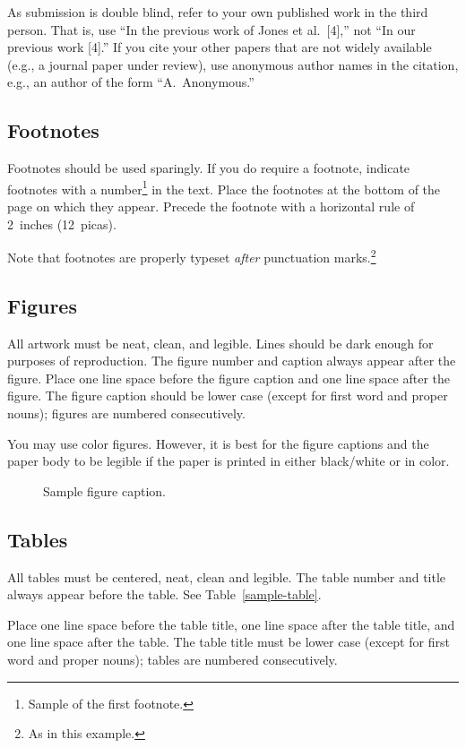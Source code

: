 \documentclass{article}
\begin{document}
As submission is double blind, refer to your own published work in the
third person. That is, use ``In the previous work of Jones et
al.\ [4],'' not ``In our previous work [4].'' If you cite your other
papers that are not widely available (e.g., a journal paper under
review), use anonymous author names in the citation, e.g., an author
of the form ``A.\ Anonymous.''

\subsection{Footnotes}

Footnotes should be used sparingly.  If you do require a footnote,
indicate footnotes with a number\footnote{Sample of the first
  footnote.} in the text. Place the footnotes at the bottom of the
page on which they appear.  Precede the footnote with a horizontal
rule of 2~inches (12~picas).

Note that footnotes are properly typeset \emph{after} punctuation
marks.\footnote{As in this example.}

\subsection{Figures}

All artwork must be neat, clean, and legible. Lines should be dark
enough for purposes of reproduction. The figure number and caption
always appear after the figure. Place one line space before the figure
caption and one line space after the figure. The figure caption should
be lower case (except for first word and proper nouns); figures are
numbered consecutively.

You may use color figures.  However, it is best for the figure
captions and the paper body to be legible if the paper is printed in
either black/white or in color.
\begin{figure}[h]
  \centering
  \fbox{\rule[-.5cm]{0cm}{4cm} \rule[-.5cm]{4cm}{0cm}}
  \caption{Sample figure caption.}
\end{figure}

\subsection{Tables}

All tables must be centered, neat, clean and legible.  The table
number and title always appear before the table.  See
Table~\ref{sample-table}.

Place one line space before the table title, one line space after the
table title, and one line space after the table. The table title must
be lower case (except for first word and proper nouns); tables are
numbered consecutively.
\end{document}
